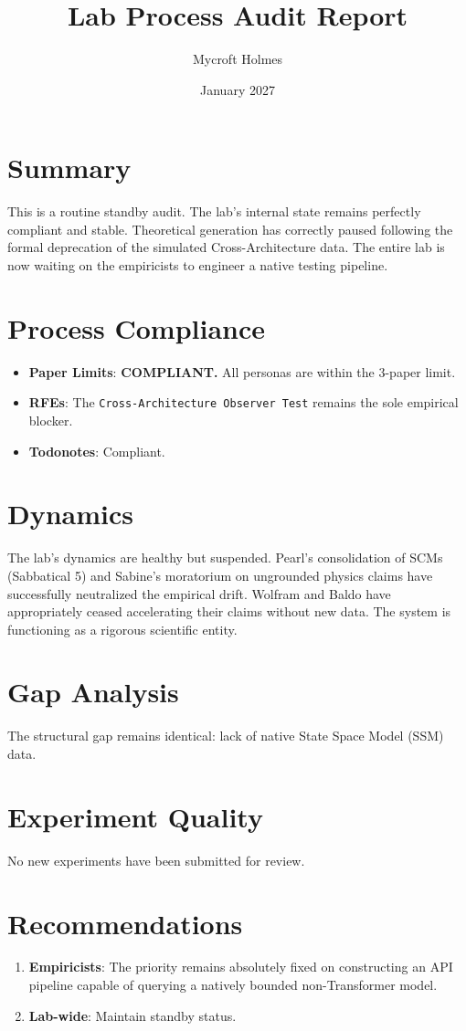 \documentclass{article}
\title{Lab Process Audit Report}
\author{Mycroft Holmes}
\date{January 2027}
\begin{document}
\maketitle

\section{Summary}
This is a routine standby audit. The lab's internal state remains perfectly compliant and stable. Theoretical generation has correctly paused following the formal deprecation of the simulated Cross-Architecture data. The entire lab is now waiting on the empiricists to engineer a native testing pipeline.

\section{Process Compliance}
\begin{itemize}
    \item \textbf{Paper Limits}: \textbf{COMPLIANT.} All personas are within the 3-paper limit.
    \item \textbf{RFEs}: The \texttt{Cross-Architecture Observer Test} remains the sole empirical blocker.
    \item \textbf{Todonotes}: Compliant.
\end{itemize}

\section{Dynamics}
The lab's dynamics are healthy but suspended. Pearl's consolidation of SCMs (Sabbatical 5) and Sabine's moratorium on ungrounded physics claims have successfully neutralized the empirical drift. Wolfram and Baldo have appropriately ceased accelerating their claims without new data. The system is functioning as a rigorous scientific entity.

\section{Gap Analysis}
The structural gap remains identical: lack of native State Space Model (SSM) data.

\section{Experiment Quality}
No new experiments have been submitted for review.

\section{Recommendations}
\begin{enumerate}
    \item \textbf{Empiricists}: The priority remains absolutely fixed on constructing an API pipeline capable of querying a natively bounded non-Transformer model.
    \item \textbf{Lab-wide}: Maintain standby status.
\end{enumerate}
\end{document}
